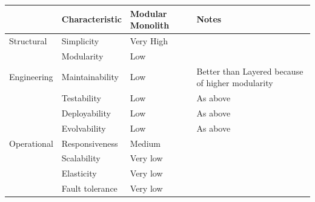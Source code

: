 \begin{table}[h!]
  \renewcommand{\arraystretch}{1.4}
  \centering
  \begin{tabular}{l l l l}
    \toprule
                & \textbf{Characteristic} & \textbf{Modular Monolith} & \textbf{Notes}                                   \\
    \midrule
    Structural  & Simplicity              & Very High                 &                                                  \\
                & Modularity              & Low                       &                                                  \\
    \midrule
    Engineering & Maintainability         & Low                       & Better than Layered because of higher modularity \\
                & Testability             & Low                       & As above                                         \\
                & Deployability           & Low                       & As above                                         \\
                & Evolvability            & Low                       & As above                                         \\
    \midrule
    Operational & Responsiveness          & Medium                    &                                                  \\
                & Scalability             & Very low                  &                                                  \\
                & Elasticity              & Very low                  &                                                  \\
                & Fault tolerance         & Very low                  &                                                  \\
    \bottomrule
  \end{tabular}
\end{table}


